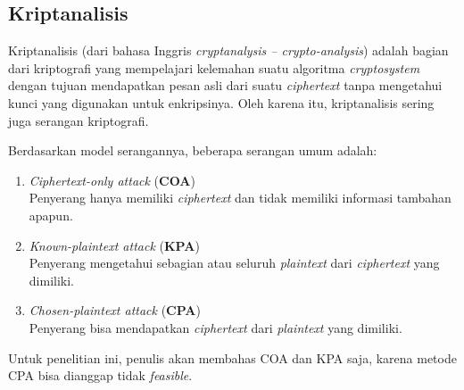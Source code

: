 \subsection{Kriptanalisis}
Kriptanalisis (dari bahasa Inggris \emph{cryptanalysis -- crypto-analysis}) adalah
bagian dari kriptografi yang mempelajari kelemahan suatu algoritma \emph{cryptosystem}
dengan tujuan mendapatkan pesan asli dari suatu \emph{ciphertext} tanpa mengetahui 
kunci yang digunakan untuk enkripsinya. Oleh karena itu, kriptanalisis sering juga 
serangan kriptografi.\par
Berdasarkan model serangannya, beberapa serangan umum adalah:
\begin{enumerate}[label=\alph*.]
	\item \emph{Ciphertext-only attack} (\textbf{COA})\\ 
	Penyerang hanya memiliki \emph{ciphertext} dan tidak memiliki informasi tambahan apapun.
	\item \emph{Known-plaintext attack} (\textbf{KPA})\\
	Penyerang mengetahui sebagian atau seluruh \emph{plaintext} dari \emph{ciphertext} yang dimiliki.
	\item \emph{Chosen-plaintext attack} (\textbf{CPA})\\
	Penyerang bisa mendapatkan \emph{ciphertext} dari \emph{plaintext} yang dimiliki.
\end{enumerate}
Untuk penelitian ini, penulis akan membahas COA dan KPA saja, karena metode CPA bisa dianggap tidak \textit{feasible}.\\

